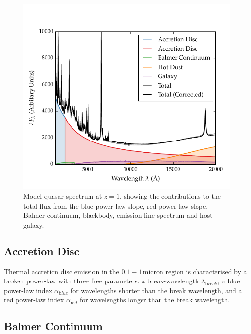 \begin{figure}
  \centering
  \includegraphics[width=\textwidth]{figures/chapter05/sed_model.pdf}
  \caption[{Model quasar spectrum at $z=1$, showing the contributions to the total flux from the blue power-law slope, red power-law slope, Balmer continuum, blackbody, emission-line spectrum and host galaxy.}]{Model quasar spectrum at $z=1$, showing the contributions to the total flux from the blue power-law slope, red power-law slope, Balmer continuum, blackbody, emission-line spectrum and host galaxy. }
  \label{fig:modelsed}
\end{figure}


\subsection{Accretion Disc}

Thermal accretion disc emission in the $0.1 - 1$\,micron region is characterised by a broken power-law with three free parameters: a break-wavelength $\lambda_{\mathrm break}$, a blue power-law index $\alpha_{\mathrm blue}$ for wavelengths shorter than the break wavelength, and a red power-law index $\alpha_{\mathrm red}$ for wavelengths longer than the break wavelength.

\subsection{Balmer Continuum}

